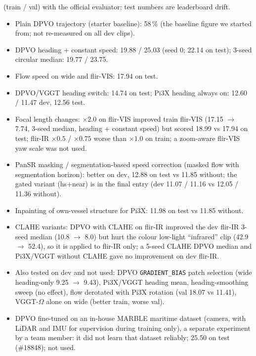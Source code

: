 \documentclass[11pt]{article}
\begin{document}
\begin{itemize}
    (train / val) with the official evaluator; test numbers are leaderboard drift.
    \begin{itemize}[nosep]
      \item Plain DPVO trajectory (starter baseline): 58\,\% (the baseline figure we started from; not re-measured on all dev clips).
      \item DPVO heading + constant speed: 19.88 / 25.03 (seed 0; 22.14 on test); 3-seed circular median: 19.77 / 23.75.
      \item Flow speed on wide and flir-VIS: 17.94 on test.
      \item DPVO/VGGT heading switch: 14.74 on test; Pi3X heading always on: 12.60 / 11.47 dev, 12.56 test.
      \item Focal length changes: $\times2.0$ on flir-VIS improved train flir-VIS (17.15 $\rightarrow$ 7.74, 3-seed median, heading
        + constant speed) but scored 18.99 vs 17.94 on test; flir-IR $\times0.5$ / $\times0.75$ worse than $\times1.0$ on train;
        a zoom-aware flir-VIS yaw scale was not used.
      \item PanSR masking / segmentation-based speed correction (masked flow with segmentation horizon): better on dev, 12.88
        on test vs 11.85 without; the gated variant (hs+near) is in the final entry (dev 11.07 / 11.16 vs 12.05 / 11.36 without).
      \item Inpainting of own-vessel structure for Pi3X: 11.98 on test vs 11.85 without.
      \item CLAHE variants: DPVO with CLAHE on flir-IR improved the dev flir-IR 3-seed median (10.8 $\rightarrow$ 8.0) but
        hurt the colour low-light ``infrared'' clip (42.9 $\rightarrow$ 52.4), so it is applied to flir-IR only; a 5-seed
        CLAHE DPVO median and Pi3X/VGGT without CLAHE gave no improvement on dev flir-IR.
      \item Also tested on dev and not used: DPVO \texttt{GRADIENT\_BIAS} patch selection (wide heading-only 9.25
        $\rightarrow$ 9.43), Pi3X/VGGT heading mean, heading-smoothing sweep (no effect), flow derotated with Pi3X
        rotation (val 18.07 vs 11.41), VGGT-$\Omega$ alone on wide (better train, worse val).
      \item DPVO fine-tuned on an in-house MARBLE maritime dataset (camera, with LiDAR and IMU for supervision during
        training only), a separate experiment by a team member: it did not learn that dataset reliably; 25.50 on test
        (\#18848); not used.
    \end{itemize}
\end{itemize}
\end{document}
